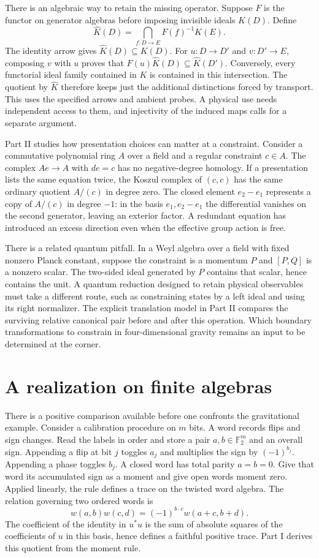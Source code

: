\documentclass[11pt,letterpaper]{article}
\begin{document}
There is an algebraic way to retain the missing operator. Suppose $F$ is the functor on generator algebras before imposing invisible ideals $K(D)$. Define
\[
 \widehat K(D)=\bigcap_{f:D\to E} F(f)^{-1}K(E).
\]
The identity arrow gives $\widehat K(D)\subseteq K(D)$. For $u:D\to D'$ and $v:D'\to E$, composing $v$ with $u$ proves that $F(u)\widehat K(D)\subseteq\widehat K(D')$. Conversely, every functorial ideal family contained in $K$ is contained in this intersection. The quotient by $\widehat K$ therefore keeps just the additional distinctions forced by transport. This uses the specified arrows and ambient probes. A physical use needs independent access to them, and injectivity of the induced maps calls for a separate argument.

Part II studies how presentation choices can matter at a constraint. Consider a commutative polynomial ring $A$ over a field and a regular constraint $c\in A$. The complex $A e\to A$ with $de=c$ has no negative-degree homology. If a presentation lists the same equation twice, the Koszul complex of $(c,c)$ has the same ordinary quotient $A/(c)$ in degree zero. The closed element $e_2-e_1$ represents a copy of $A/(c)$ in degree $-1$: in the basis $e_1,e_2-e_1$ the differential vanishes on the second generator, leaving an exterior factor. A redundant equation has introduced an excess direction even when the effective group action is free.

There is a related quantum pitfall. In a Weyl algebra over a field with fixed nonzero Planck constant, suppose the constraint is a momentum $P$ and $[P,Q]$ is a nonzero scalar. The two-sided ideal generated by $P$ contains that scalar, hence contains the unit. A quantum reduction designed to retain physical observables must take a different route, such as constraining states by a left ideal and using its right normalizer. The explicit translation model in Part II compares the surviving relative canonical pair before and after this operation. Which boundary transformations to constrain in four-dimensional gravity remains an input to be determined at the corner.

\section{A realization on finite algebras}
There is a positive comparison available before one confronts the gravitational example. Consider a calibration procedure on $m$ bits. A word records flips and sign changes. Read the labels in order and store a pair $a,b\in\mathbb F_2^m$ and an overall sign. Appending a flip at bit $j$ toggles $a_j$ and multiplies the sign by $(-1)^{b_j}$. Appending a phase toggles $b_j$. A closed word has total parity $a=b=0$. Give that word its accumulated sign as a moment and give open words moment zero. Applied linearly, the rule defines a trace on the twisted word algebra. The relation governing two ordered words is
\[
 w(a,b)w(c,d)=(-1)^{b\cdot c}w(a+c,b+d).
\]
The coefficient of the identity in $u^*u$ is the sum of absolute squares of the coefficients of $u$ in this basis, hence defines a faithful positive trace. Part I derives this quotient from the moment rule.
\end{document}

